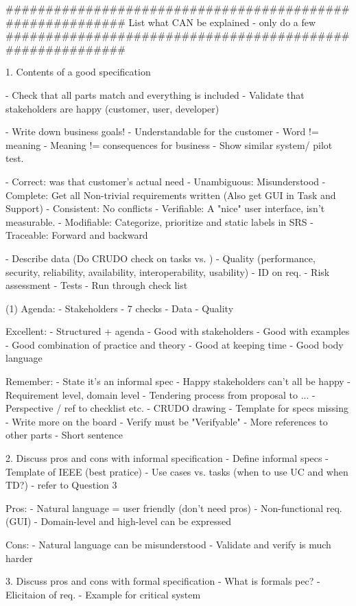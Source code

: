 ##########################################################
List what CAN be explained - only do a few
##########################################################

1. Contents of a good specification

- Check that all parts match and everything is included
- Validate that stakeholders are happy (customer, user, developer)

- Write down business goals!
- Understandable for the customer
	- Word != meaning
	- Meaning != consequences for business
	- Show similar system/ pilot test.

- Correct: was that customer's actual need
- Unambiguous: Misunderstood
- Complete: Get all Non-trivial requirements written (Also get GUI in Task and Support)
- Consistent: No conflicts
- Verifiable: A "nice" user interface, isn't measurable.
- Modifiable: Categorize, prioritize and static labels in SRS
- Traceable: Forward and backward

- Describe data (Do CRUDO check on tasks vs. )
- Quality (performance, security, reliability, availability, interoperability, usability)
- ID on req.
- Risk assessment
- Tests
- Run through check list

(1)
Agenda:
- Stakeholders
- 7 checks
- Data
- Quality

Excellent:
- Structured + agenda
- Good with stakeholders
- Good with examples
- Good combination of practice and theory
- Good at keeping time
- Good body language

Remember:
- State it's an informal spec
- Happy stakeholders can't all be happy
- Requirement level, domain level
- Tendering process from proposal to ...
- Perspective / ref to checklist etc.
- CRUDO drawing
- Template for specs missing
- Write more on the board
- Verify must be "Verifyable"
- More references to other parts
- Short sentence


2. Discuss pros and cons with informal specification
- Define informal specs
- Template of IEEE (best pratice)
	- Use cases vs. tasks (when to use UC and when TD?)
- refer to Question 3

	Pros:
	- Natural language = user friendly (don't need pros)
	- Non-functional req. (GUI)
	- Domain-level and high-level can be expressed

	Cons: 
	- Natural language can be misunderstood
	- Validate and verify is much harder



3. Discuss pros and cons with formal specification
- What is formals  pec?
	- Elicitaion of req.
	- Example for critical system

